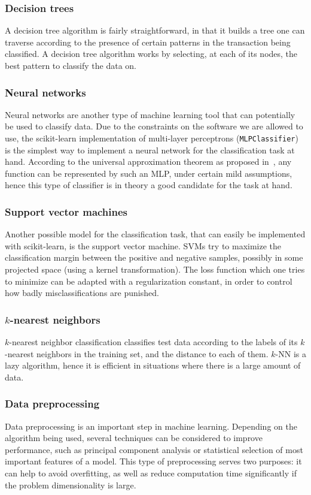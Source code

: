 \documentclass{sigkddExp}
\newcommand{\py}[1]{\texttt{#1}}
\begin{document}
\subsubsection{Decision trees}
A decision tree algorithm is fairly straightforward, in that it builds a tree one can traverse according to the presence of certain patterns in the transaction being classified.
A decision tree algorithm works by selecting, at each of its nodes, the best pattern to classify the data on.

\subsubsection{Neural networks}
Neural networks are another type of machine learning tool that can potentially be used to classify data.
Due to the constraints on the software we are allowed to use, the scikit-learn implementation of multi-layer perceptrons (\py{MLPClassifier}) is the simplest way to implement a neural network for the classification task at hand.
According to the universal approximation theorem as proposed in~\cite{Cybenko1989}, any function can be represented by such an MLP, under certain mild assumptions, hence this type of classifier is in theory a good candidate for the task at hand.

\subsubsection{Support vector machines}
Another possible model for the classification task, that can easily be implemented with scikit-learn, is the support vector machine.
SVMs try to maximize the classification margin between the positive and negative samples, possibly in some projected space (using a kernel transformation).
The loss function which one tries to minimize can be adapted with a regularization constant, in order to control how badly misclassifications are punished.

\subsubsection{\(k\)-nearest neighbors}
\(k\)-nearest neighbor classification classifies test data according to the labels of its \(k\)-nearest neighbors in the training set, and the distance to each of them.
\(k\)-NN is a lazy algorithm, hence it is efficient in situations where there is a large amount of data.

\subsubsection{Data preprocessing}
Data preprocessing is an important step in machine learning.
Depending on the algorithm being used, several techniques can be considered to improve performance, such as principal component analysis or statistical selection of most important features of a model.
This type of preprocessing serves two purposes: it can help to avoid overfitting, as well as reduce computation time significantly if the problem dimensionality is large.
\end{document}
